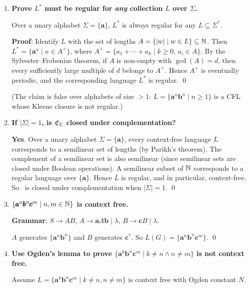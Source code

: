 \begin{enumerate}[{9.}1. ]
\item \textbf{Prove $L^*$ must be regular for \emph{any} collection $L$ over $\Sigma$.}

Over a unary alphabet $\Sigma = \{\pmb{a}\}$, $L^*$ is always regular for any $L \subseteq \Sigma^*$.

\textbf{Proof}: Identify $L$ with the set of lengths $A = \{|w| \mid w \in L\} \subseteq \mathbb{N}$. Then $L^* = \{\pmb{a}^n \mid n \in A^+\}$, where $A^+ = \{a_1 + \cdots + a_k \mid k \geq 0,\, a_i \in A\}$. By the Sylvester--Frobenius theorem, if $A$ is non-empty with $\gcd(A) = d$, then every sufficiently large multiple of $d$ belongs to $A^+$. Hence $A^+$ is eventually periodic, and the corresponding language $L^*$ is regular. \qed

(The claim is false over alphabets of size $> 1$: $L = \{\pmb{a}^n\pmb{b}^n \mid n\geq 1\}$ is a CFL whose Kleene closure is not regular.)

\item \textbf{If $|\Sigma|=1$, is $\mathfrak{C}_\Sigma$ closed under complementation?}

\textbf{Yes}. Over a unary alphabet $\Sigma = \{\pmb{a}\}$, every context-free language $L$ corresponds to a semilinear set of lengths (by Parikh's theorem). The complement of a semilinear set is also semilinear (since semilinear sets are closed under Boolean operations). A semilinear subset of $\mathbb{N}$ corresponds to a regular language over $\{\pmb{a}\}$. Hence $\overline{L}$ is regular, and in particular, context-free. So \CSIG\ is closed under complementation when $|\Sigma|=1$. \qed

\item \textbf{$\{\pmb{a}^n\pmb{b}^n\pmb{c}^m \mid n,m \in \mathbb{N}\}$ is context free.}

\textbf{Grammar}: $S \to AB$, $A \to \pmb{a}A\pmb{b} \mid \lambda$, $B \to \pmb{c}B \mid \lambda$.

$A$ generates $\{\pmb{a}^n\pmb{b}^n\}$ and $B$ generates $\pmb{c}^*$. So $L(G) = \{\pmb{a}^n\pmb{b}^n\pmb{c}^m\}$. \qed

\item \textbf{Use Ogden's lemma to prove $\{\pmb{a}^k\pmb{b}^n\pmb{c}^m \mid k\neq n \wedge n\neq m\}$ is not context free.}

Assume $L = \{\pmb{a}^k\pmb{b}^n\pmb{c}^m \mid k\neq n, n\neq m\}$ is context free with Ogden constant $N$.


\end{enumerate}
